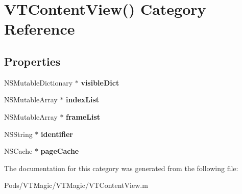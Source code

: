 \hypertarget{category_v_t_content_view_07_08}{}\section{V\+T\+Content\+View() Category Reference}
\label{category_v_t_content_view_07_08}
\subsection*{Properties}
\begin{DoxyCompactItemize}
\item 
\mbox{\label{category_v_t_content_view_07_08_a8d2d22ca4c2b459dfd6cc7f24b1e0086}} 
N\+S\+Mutable\+Dictionary $\ast$ {\bfseries visible\+Dict}
\item 
\mbox{\label{category_v_t_content_view_07_08_a60c8c674beca099c1c7e14a485f158fd}} 
N\+S\+Mutable\+Array $\ast$ {\bfseries index\+List}
\item 
\mbox{\label{category_v_t_content_view_07_08_ad3046c9a25f1917895e314f6e7c90a3b}} 
N\+S\+Mutable\+Array $\ast$ {\bfseries frame\+List}
\item 
\mbox{\label{category_v_t_content_view_07_08_a47c4c9eb2ce70981577f6e0bc1ff0cd2}} 
N\+S\+String $\ast$ {\bfseries identifier}
\item 
\mbox{\label{category_v_t_content_view_07_08_a83d925cc974baec314bcadce55df9862}} 
N\+S\+Cache $\ast$ {\bfseries page\+Cache}
\end{DoxyCompactItemize}


The documentation for this category was generated from the following file\+:\begin{DoxyCompactItemize}
\item 
Pods/\+V\+T\+Magic/\+V\+T\+Magic/V\+T\+Content\+View.\+m\end{DoxyCompactItemize}
